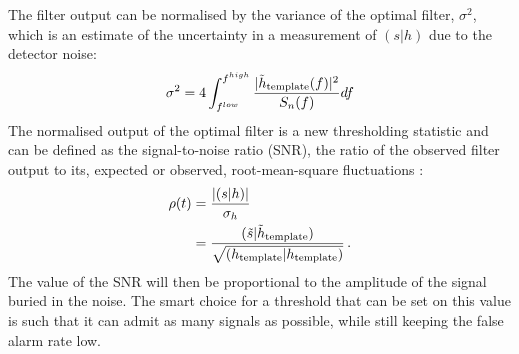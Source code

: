 \documentclass[binding=0.6cm, LaM]{sapthesis}
\begin{document}
	The filter output can be normalised by the variance of the optimal filter, $\sigma^2$,
	which is an estimate of the uncertainty in a measurement of $(s|h)$ due to the detector noise:
        \begin{equation}
          \sigma^2 =4 \int^{f^{high}}_{f^{low}} {{|\tilde h_{\rm template}(f)|^2} \over {S_n(f)}}df
        \end{equation}
 	The normalised output of the optimal filter is a new thresholding statistic and can be defined as  
	the signal-to-noise ratio (SNR), the ratio of the observed filter output to its,
        expected or observed, root-mean-square fluctuations \cite{24}:
        \begin{align}
          \rho(t) &= {{| (s|h) |} \over {\sigma_{h}}} \\
          &= {{(\tilde s|\tilde h_{\rm template})} \over {\sqrt{(h_{\rm template}|h_{\rm template})}}}\,.
        \end{align}
        The value of the SNR will then be proportional to the amplitude of the signal buried in the noise.
	The smart choice for a threshold that can be set on this value is such that
	it can admit as many signals as possible, while still keeping the false alarm rate low. 
\end{document}
